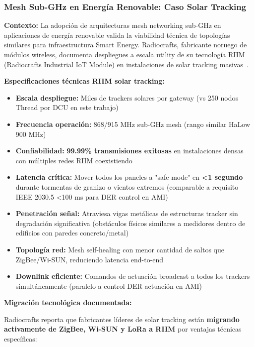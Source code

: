\subsubsection{Mesh Sub-GHz en Energía Renovable: Caso Solar Tracking}

\textbf{Contexto:} La adopción de arquitecturas mesh networking sub-GHz en aplicaciones de energía renovable valida la viabilidad técnica de topologías similares para infraestructura Smart Energy. Radiocrafts, fabricante noruego de módulos wireless, documenta despliegues a escala utility de su tecnología RIIM (Radiocrafts Industrial IoT Module) en instalaciones de solar tracking masivas~\cite{radiocraftsCommissioningLargeSolar2025}.

\textbf{Especificaciones técnicas RIIM solar tracking:}

\begin{itemize}
    \item \textbf{Escala despliegue:} Miles de trackers solares por gateway (vs 250 nodos Thread por DCU en este trabajo)
    \item \textbf{Frecuencia operación:} 868/915 MHz sub-GHz mesh (rango similar HaLow 900 MHz)
    \item \textbf{Confiabilidad:} \textbf{99.99\% transmisiones exitosas} en instalaciones densas con múltiples redes RIIM coexistiendo
    \item \textbf{Latencia crítica:} Mover todos los paneles a "safe mode" en \textbf{<1 segundo} durante tormentas de granizo o vientos extremos (comparable a requisito IEEE 2030.5 <100 ms para DER control en AMI)
    \item \textbf{Penetración señal:} Atraviesa vigas metálicas de estructuras tracker sin degradación significativa (obstáculos físicos similares a medidores dentro de edificios con paredes concreto/metal)
    \item \textbf{Topología red:} Mesh self-healing con menor cantidad de saltos que ZigBee/Wi-SUN, reduciendo latencia end-to-end
    \item \textbf{Downlink eficiente:} Comandos de actuación broadcast a todos los trackers simultáneamente (paralelo a control DER actuación en AMI)
\end{itemize}

\textbf{Migración tecnológica documentada:}

Radiocrafts reporta que fabricantes líderes de solar tracking están \textbf{migrando activamente de ZigBee, Wi-SUN y LoRa a RIIM} por ventajas técnicas específicas:

